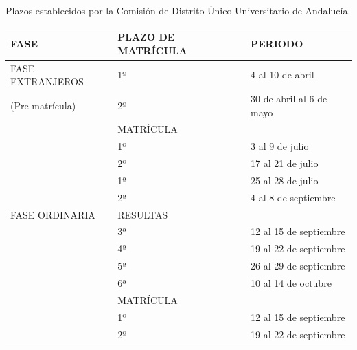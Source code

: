 \documentclass{article}
\begin{document}
\begin{itemize}
\begin{itemize}
\begin{scriptsize}
                  Plazos establecidos por la Comisión de Distrito Único Universitario de Andalucía.

                  \vspace{0.4cm}
                  \begin{table}[h!]\centering\renewcommand{\arraystretch}{1.3}
                    \begin{tabular}{|p{}|p{}|p{}|}\hline
                      FASE                & PLAZO DE MATRÍCULA & PERIODO                  \\\hline
                      FASE EXTRANJEROS    & 1º                 & 4 al 10 de abril         \\\hline
                      (Pre-matrícula)     & 2º                 & 30 de abril al 6 de mayo \\\hline
                                          & MATRÍCULA          &                          \\\hline
                                          & 1º                 & 3 al 9 de julio          \\\hline
                                          & 2º                 & 17 al 21 de julio        \\\hline
                                          & 1ª                 & 25 al 28 de julio        \\\hline
                                          & 2ª                 & 4 al 8 de septiembre     \\\hline
                      FASE ORDINARIA      & RESULTAS           &                          \\\hline
                                          & 3ª                 & 12 al 15 de septiembre   \\\hline
                                          & 4ª                 & 19 al 22 de septiembre   \\\hline
                                          & 5ª                 & 26 al 29 de septiembre   \\\hline
                                          & 6ª                 & 10 al 14 de octubre      \\\hline
                                          & MATRÍCULA          &                          \\\hline
                                          & 1º                 & 12 al 15 de septiembre   \\\hline
                                          & 2º                 & 19 al 22 de septiembre   \\\hline

\end{tabular}
\end{table}
\end{scriptsize}
\end{itemize}
\end{itemize}
\end{document}

